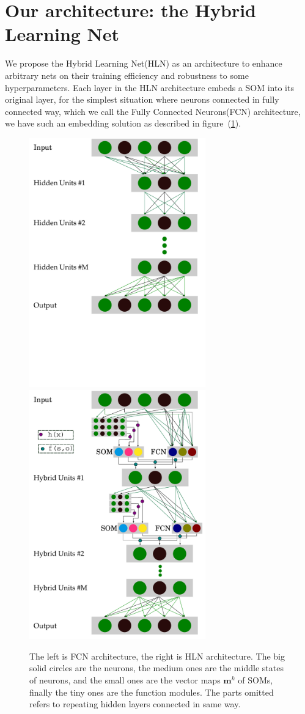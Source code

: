 \documentclass[3p,times,procedia]{elsarticle}
\begin{document}
\section{Our architecture: 
the Hybrid Learning Net}
We propose the Hybrid Learning Net(HLN) as
an architecture to enhance arbitrary nets
on their training efficiency and robustness 
to some hyperparameters.
Each layer in the HLN architecture embeds a
SOM into its original layer, for the simplest
situation where neurons connected in fully
connected way, which we call the Fully 
Connected Neurons(FCN) architecture, we have 
such an embedding solution as described in 
figure~(\ref{fig:1}).

\begin{figure}[h]
	\centerline{
		\includegraphics[width=3in]{FCN}
		\hspace*{5mm}
		\includegraphics[width=3in]{HLN}
	}
\caption{The left is FCN architecture, 
	the right is HLN architecture.
	The big solid circles are the 
	neurons, the medium ones are the 
	middle states of neurons, and 
	the small ones are the vector maps 
	$\mathbf{m}^k$ of SOMs, finally the 
	tiny ones are the function modules.
	The parts omitted refers to repeating
	hidden layers connected in same way.}
	\label{fig:1}
\end{figure}
\end{document}
